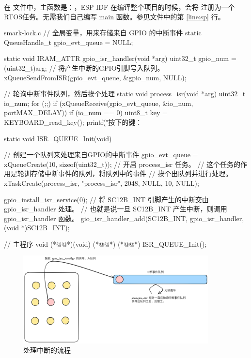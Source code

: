 \documentclass[lang=cn,newtx,10pt,scheme=chinese]{elegantbook}
\begin{document}
在  文件中，主函数是：，ESP-IDF 在编译整个项目的时候，会将  注册为一个RTOS任务。无需我们自己编写 main 函数。参见文件中的第 \ref{line:sp} 行。

\begin{mycode}{smark-lock.c}
// 全局变量，用来存储来自 GPIO 的中断事件
static QueueHandle_t gpio_evt_queue = NULL;

static void IRAM_ATTR gpio_isr_handler(void *arg)
{
  uint32_t gpio_num = (uint32_t)arg;
  // 将产生中断的GPIO引脚号入队列。
  xQueueSendFromISR(gpio_evt_queue, &gpio_num, NULL);
}

// 轮询中断事件队列，然后挨个处理
static void process_isr(void *arg)
{
  uint32_t io_num;
  for (;;)
  {
    if (xQueueReceive(gpio_evt_queue, &io_num, portMAX_DELAY))
    {
      if (io_num == 0)
      {
        uint8_t key = KEYBOARD_read_key();
        printf("按下的键：%
      }
    }
  }
}

static void ISR_QUEUE_Init(void)
{
  // 创建一个队列来处理来自GPIO的中断事件
  gpio_evt_queue = xQueueCreate(10, sizeof(uint32_t));
  // 开启 process_isr 任务。
  // 这个任务的作用是轮训存储中断事件的队列，将队列中的事件
  // 挨个出队列并进行处理。
  xTaskCreate(process_isr, "process_isr", 2048, NULL, 10, NULL);

  gpio_install_isr_service(0);
  // 将 SC12B_INT 引脚产生的中断交由 gpio_isr_handler 处理。
  // 也就是说一旦 SC12B_INT 产生中断，则调用 gpio_isr_handler 函数。
  gio_isr_handler_add(SC12B_INT, gpio_isr_handler, (void *)SC12B_INT);
}

// 主程序
void (*@@*)(void) (*@\label{line:sp}@*) (*@@*)
{
  ISR_QUEUE_Init();
}
\end{mycode}

\begin{figure}[!htb]
\centering
\includegraphics[width=0.9\textwidth]{process_isr.png}
\caption{处理中断的流程}
\end{figure}
\end{document}
